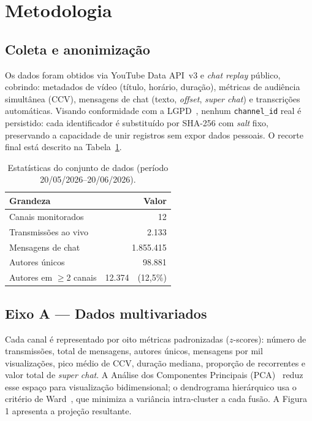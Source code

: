 \documentclass[a4,11pt]{wmecai}
\begin{document}
\section{Metodologia}

\subsection{Coleta e anonimização}

Os dados foram obtidos via YouTube Data API~v3 e \textit{chat replay}
público, cobrindo: metadados de vídeo (título, horário, duração), métricas
de audiência simultânea (CCV), mensagens de chat (texto, \textit{offset},
\textit{super chat}) e transcrições automáticas.
Visando conformidade com a LGPD~\cite{LGPD2018}, nenhum
\texttt{channel\_id} real é persistido: cada identificador é substituído
por SHA-256 com \textit{salt} fixo, preservando a capacidade de unir
registros sem expor dados pessoais.
O recorte final está descrito na Tabela~\ref{tab:dataset}.

\begin{table}[h]
\caption{Estatísticas do conjunto de dados (período 20/05/2026--20/06/2026).}
\centering
\small
\begin{tabular}{lr}
\toprule
\textbf{Grandeza} & \textbf{Valor} \\
\midrule
Canais monitorados        & 12 \\
Transmissões ao vivo      & 2.133 \\
Mensagens de chat         & 1.855.415 \\
Autores únicos            & 98.881 \\
Autores em $\geq$2 canais & 12.374\ \ (12,5\%) \\
\bottomrule
\end{tabular}
\label{tab:dataset}
\end{table}

\subsection{Eixo A — Dados multivariados}

Cada canal é representado por oito métricas padronizadas ($z$-scores):
número de transmissões, total de mensagens, autores únicos, mensagens por
mil visualizações, pico médio de CCV, duração mediana, proporção de
recorrentes e valor total de \textit{super chat}.
A Análise dos Componentes Principais (PCA)~\cite{Wold1987} reduz esse espaço para visualização bidimensional;
o dendrograma hierárquico usa o critério de Ward~\cite{Ward1963}, que
minimiza a variância intra-cluster a cada fusão.
A Figura 1 apresenta a projeção resultante.
\end{document}
